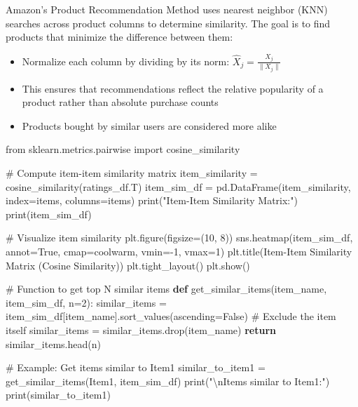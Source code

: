 \documentclass[
  letterpaper,
  DIV=11,
  numbers=noendperiod]{scrreprt}
\newenvironment{Shaded}{\begin{snugshade}}{\end{snugshade}}
\newcommand{\BuiltInTok}[1]{\textcolor[rgb]{0.00,0.23,0.31}{#1}}
\newcommand{\CharTok}[1]{\textcolor[rgb]{0.13,0.47,0.30}{#1}}
\newcommand{\CommentTok}[1]{\textcolor[rgb]{0.37,0.37,0.37}{#1}}
\newcommand{\ControlFlowTok}[1]{\textcolor[rgb]{0.00,0.23,0.31}{\textbf{#1}}}
\newcommand{\DecValTok}[1]{\textcolor[rgb]{0.68,0.00,0.00}{#1}}
\newcommand{\ImportTok}[1]{\textcolor[rgb]{0.00,0.46,0.62}{#1}}
\newcommand{\KeywordTok}[1]{\textcolor[rgb]{0.00,0.23,0.31}{\textbf{#1}}}
\newcommand{\NormalTok}[1]{\textcolor[rgb]{0.00,0.23,0.31}{#1}}
\newcommand{\OperatorTok}[1]{\textcolor[rgb]{0.37,0.37,0.37}{#1}}
\newcommand{\StringTok}[1]{\textcolor[rgb]{0.13,0.47,0.30}{#1}}
\newcommand{\VariableTok}[1]{\textcolor[rgb]{0.07,0.07,0.07}{#1}}
\providecommand{\tightlist}{%
  \setlength{\itemsep}{0pt}\setlength{\parskip}{0pt}}\usepackage{longtable,booktabs,array}
\begin{document}
Amazon's Product Recommendation Method uses nearest neighbor (KNN)
searches across product columns to determine similarity. The goal is to
find products that minimize the difference between them:

\begin{itemize}
\tightlist
\item
  Normalize each column by dividing by its norm:
  \(\hat{X}_j = \frac{X_j}{\|X_j\|}\)
\item
  This ensures that recommendations reflect the relative popularity of a
  product rather than absolute purchase counts
\item
  Products bought by similar users are considered more alike
\end{itemize}

\begin{Shaded}
\begin{Highlighting}[]
\ImportTok{from}\NormalTok{ sklearn.metrics.pairwise }\ImportTok{import}\NormalTok{ cosine\_similarity}

\CommentTok{\# Compute item{-}item similarity matrix}
\NormalTok{item\_similarity }\OperatorTok{=}\NormalTok{ cosine\_similarity(ratings\_df.T)}
\NormalTok{item\_sim\_df }\OperatorTok{=}\NormalTok{ pd.DataFrame(item\_similarity, index}\OperatorTok{=}\NormalTok{items, columns}\OperatorTok{=}\NormalTok{items)}
\BuiltInTok{print}\NormalTok{(}\StringTok{"Item{-}Item Similarity Matrix:"}\NormalTok{)}
\BuiltInTok{print}\NormalTok{(item\_sim\_df)}

\CommentTok{\# Visualize item similarity}
\NormalTok{plt.figure(figsize}\OperatorTok{=}\NormalTok{(}\DecValTok{10}\NormalTok{, }\DecValTok{8}\NormalTok{))}
\NormalTok{sns.heatmap(item\_sim\_df, annot}\OperatorTok{=}\VariableTok{True}\NormalTok{, cmap}\OperatorTok{=}\StringTok{\textquotesingle{}coolwarm\textquotesingle{}}\NormalTok{, vmin}\OperatorTok{={-}}\DecValTok{1}\NormalTok{, vmax}\OperatorTok{=}\DecValTok{1}\NormalTok{)}
\NormalTok{plt.title(}\StringTok{\textquotesingle{}Item{-}Item Similarity Matrix (Cosine Similarity)\textquotesingle{}}\NormalTok{)}
\NormalTok{plt.tight\_layout()}
\NormalTok{plt.show()}

\CommentTok{\# Function to get top N similar items}
\KeywordTok{def}\NormalTok{ get\_similar\_items(item\_name, item\_sim\_df, n}\OperatorTok{=}\DecValTok{2}\NormalTok{):}
\NormalTok{    similar\_items }\OperatorTok{=}\NormalTok{ item\_sim\_df[item\_name].sort\_values(ascending}\OperatorTok{=}\VariableTok{False}\NormalTok{)}
    \CommentTok{\# Exclude the item itself}
\NormalTok{    similar\_items }\OperatorTok{=}\NormalTok{ similar\_items.drop(item\_name)}
    \ControlFlowTok{return}\NormalTok{ similar\_items.head(n)}

\CommentTok{\# Example: Get items similar to Item1}
\NormalTok{similar\_to\_item1 }\OperatorTok{=}\NormalTok{ get\_similar\_items(}\StringTok{\textquotesingle{}Item1\textquotesingle{}}\NormalTok{, item\_sim\_df)}
\BuiltInTok{print}\NormalTok{(}\StringTok{"}\CharTok{\textbackslash{}n}\StringTok{Items similar to Item1:"}\NormalTok{)}
\BuiltInTok{print}\NormalTok{(similar\_to\_item1)}
\end{Highlighting}
\end{Shaded}
\end{document}
